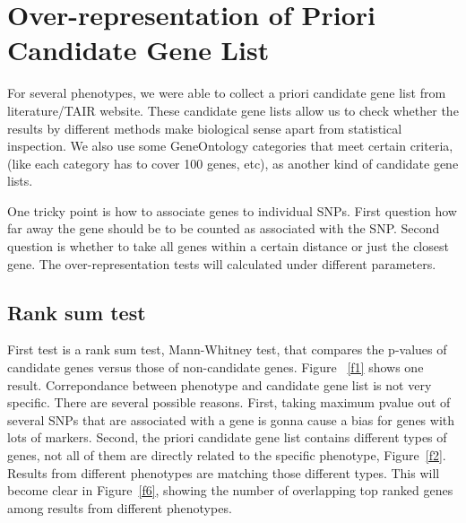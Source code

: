 \documentclass[a4paper,10pt]{article}
\begin{document}
\section{Over-representation of Priori Candidate Gene List}
For several phenotypes, we were able to collect a priori candidate gene list from literature/TAIR website. These candidate gene lists allow us to check whether the results by different methods make biological sense apart from statistical inspection. We also use some GeneOntology categories that meet certain criteria, (like each category has to cover 100 genes, etc), as another kind of candidate gene lists.

One tricky point is how to associate genes to individual SNPs. First question how far away the gene should be to be counted as associated with the SNP. Second question is whether to take all genes within a certain distance or just the closest gene. The over-representation tests will calculated under different parameters.

\subsection{Rank sum test}

First test is a rank sum test, Mann-Whitney test, that compares the p-values of candidate genes versus those of non-candidate genes. Figure ~\ref{f1} shows one result. Correpondance between phenotype and candidate gene list is not very specific. There are several possible reasons. First, taking maximum pvalue out of several SNPs that are associated with a gene is gonna cause a bias for genes with lots of markers. Second, the priori candidate gene list contains different types of genes, not all of them are directly related to the specific phenotype, Figure~\ref{f2}. Results from different phenotypes are matching those different types. This will become clear in Figure~\ref{f6}, showing the number of overlapping top ranked genes among results from different phenotypes.
\end{document}
